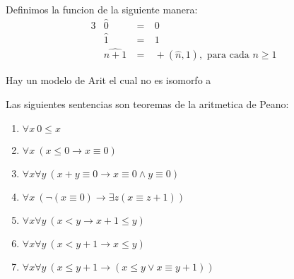   \begin{definition}
    Definimos la funcion  de la siguiente manera:
    \begin{alignat*}{3}
      &\widehat{0} &\ =&\ 0\\
      &\widehat{1} &\ =&\ 1\\
      &\widehat{n+1} &\ =&\ +(\widehat{n},1),\text{ para cada }n\geq1
    \end{alignat*}
  \end{definition}

  \begin{proposition}
    Hay un modelo de Arit el cual no es isomorfo a \pomega
  \end{proposition}

  \begin{lemma}
    Las siguientes sentencias son teoremas de la aritmetica de Peano:
    \begin{enumerate}
      \item $\forall x\ 0\leq x$
      \item $\forall x\ (x\leq0\rightarrow x\equiv 0)$
      \item $\forall x\forall y\ (x+y\equiv0\rightarrow x\equiv0\land y\equiv0)$
      \item $\forall x\ (\neg(x\equiv0)\rightarrow\exists z(x\equiv z+1))$
      \item $\forall x\forall y\ (x<y\rightarrow x+1\leq y)$
      \item $\forall x\forall y\ (x<y+1\rightarrow x\leq y)$
      \item $\forall x\forall y\ (x\leq y+1\rightarrow (x\leq y\lor x\equiv y+1))$
    \end{enumerate}
  \end{lemma}

